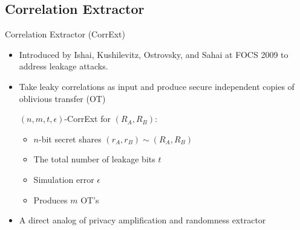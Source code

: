 \subsection{Correlation Extractor}
\begin{frame}{Correlation Extractor (CorrExt)}
	\begin{itemize}
		\item Introduced by Ishai, Kushilevitz, Ostrovsky, and Sahai at FOCS 2009 \cite{FOCS:IKOS09} to address leakage attacks. 
		\item Take leaky correlations as input and produce secure independent
		copies of oblivious transfer (OT)
		\begin{definition}
			$ (n,m,t,\epsilon) $-CorrExt for $ (R_A, R_B) $: 
			\begin{itemize}
				\item $n$-bit secret shares $ (r_A, r_B) \sim (R_A, R_B) $ 
				\item The total number of leakage bits $ t $
				\item Simulation error $ \epsilon $
				\item Produces $ m $ OT's
			\end{itemize}
		\end{definition}
		\item A direct analog of privacy amplification and randomness extractor
	\end{itemize}
\end{frame}
	

